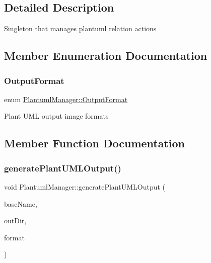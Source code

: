 \subsection{Detailed Description}
Singleton that manages plantuml relation actions 

\subsection{Member Enumeration Documentation}
\mbox{\label{class_plantuml_manager_a73ccdfc6400a28af7d9d2f92215b9af5}} 
\subsubsection{\texorpdfstring{OutputFormat}{OutputFormat}}
{\footnotesize\ttfamily enum \mbox{\hyperlink{class_plantuml_manager_a73ccdfc6400a28af7d9d2f92215b9af5}{Plantuml\+Manager\+::\+Output\+Format}}}

Plant U\+ML output image formats 

\subsection{Member Function Documentation}
\mbox{\label{class_plantuml_manager_ac7dc58177520721f3ac752f0f56abca0}} 
\subsubsection{\texorpdfstring{generatePlantUMLOutput()}{generatePlantUMLOutput()}}
{\footnotesize\ttfamily void Plantuml\+Manager\+::generate\+Plant\+U\+M\+L\+Output (\begin{DoxyParamCaption}\item[{const char $\ast$}]{base\+Name,  }\item[{const char $\ast$}]{out\+Dir,  }\item[{\mbox{\hyperlink{class_plantuml_manager_a73ccdfc6400a28af7d9d2f92215b9af5}{Output\+Format}}}]{format }\end{DoxyParamCaption})}

